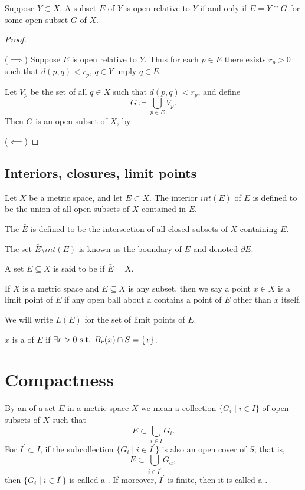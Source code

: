 \begin{proposition}
Suppose $Y\subset X$. A subset $E$ of $Y$ is open relative to $Y$ if and only if $E=Y\cap G$ for some open subset $G$ of $X$.
\end{proposition}

\begin{proof} \

($\implies$) Suppose $E$ is open relative to $Y$. Thus for each $p\in E$ there exists $r_p>0$ such that $d(p,q)<r_p$, $q\in Y$ imply $q\in E$.

Let $V_p$ be the set of all $q\in X$ such that $d(p,q)<r_p$, and define
\[G\coloneqq\bigcup_{p\in E}V_p.\]
Then $G$ is an open subset of $X$, by 

($\impliedby$)
\end{proof}

\subsection{Interiors, closures, limit points}
\begin{definition}
Let $X$ be a metric space, and let $E\subset X$. The interior $int(E)$ of $E$ is defined to be the union of all open subsets of $X$ contained in $E$.

The  $\bar{E}$ is defined to be the intersection of all closed subsets of $X$ containing $E$.

The set $\bar{E}\setminus int(E)$ is known as the boundary of $E$ and denoted $\partial E$. 

A set $E\subseteq X$ is said to be  if $\bar{E}=X$.
\end{definition}

\begin{definition}
If $X$ is a metric space and $E\subseteq X$ is any subset, then we say a point $x\in X$ is a limit point of $E$ if any open ball about a contains a point of $E$ other than $x$ itself.
\end{definition}

\begin{notation}
We will write $L(E)$ for the set of limit points of $E$.
\end{notation}

\begin{definition}
$x$ is a  of $E$ if $\exists r>0\text{ s.t. } B_r(x)\cap S=\{x\}$.
\end{definition}
\pagebreak

\section{Compactness}
\begin{definition}
By an  of a set $E$ in a metric space $X$ we mean a collection $\{G_i\mid i\in I\}$ of open subsets of $X$ such that
\[ E\subset\bigcup_{i\in I}G_i. \]
For $I^\prime\subset I$, if the subcollection $\{G_i\mid i\in I^\prime\}$ is also an open cover of $S$; that is,
\[ E\subset\bigcup_{i\in I^\prime}G_\alpha, \]
then $\{G_i\mid i\in I^\prime\}$ is called a . If moreover, $I^\prime$ is finite, then it is called a .
\end{definition}

